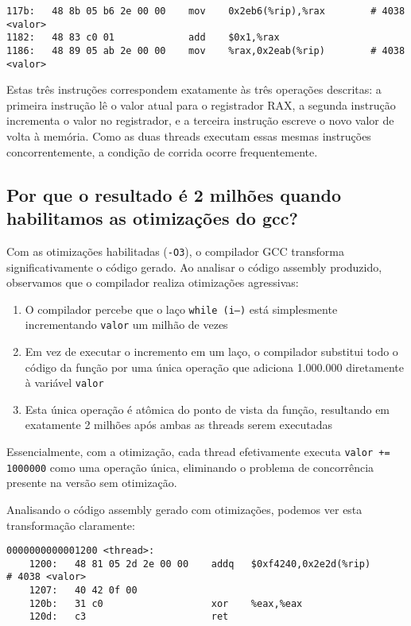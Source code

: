 \documentclass[12pt]{article}
\begin{document}
\begin{lstlisting}[language={[x86masm]Assembler}]
117b:	48 8b 05 b6 2e 00 00 	mov    0x2eb6(%rip),%rax        # 4038 <valor>
1182:	48 83 c0 01          	add    $0x1,%rax
1186:	48 89 05 ab 2e 00 00 	mov    %rax,0x2eab(%rip)        # 4038 <valor>
\end{lstlisting}

Estas três instruções correspondem exatamente às três operações descritas: a primeira instrução lê o valor atual para o registrador RAX, a segunda instrução incrementa o valor no registrador, e a terceira instrução escreve o novo valor de volta à memória. Como as duas threads executam essas mesmas instruções concorrentemente, a condição de corrida ocorre frequentemente.

\subsection{Por que o resultado é 2 milhões quando habilitamos as otimizações do gcc?}

Com as otimizações habilitadas (\texttt{-O3}), o compilador GCC transforma significativamente o código gerado. Ao analisar o código assembly produzido, observamos que o compilador realiza otimizações agressivas:

\begin{enumerate}
    \item O compilador percebe que o laço \texttt{while (i--)} está simplesmente incrementando \texttt{valor} um milhão de vezes
    \item Em vez de executar o incremento em um laço, o compilador substitui todo o código da função por uma única operação que adiciona 1.000.000 diretamente à variável \texttt{valor}
    \item Esta única operação é atômica do ponto de vista da função, resultando em exatamente 2 milhões após ambas as threads serem executadas
\end{enumerate}

Essencialmente, com a otimização, cada thread efetivamente executa \texttt{valor += 1000000} como uma operação única, eliminando o problema de concorrência presente na versão sem otimização.

Analisando o código assembly gerado com otimizações, podemos ver esta transformação claramente:

\begin{lstlisting}[language={[x86masm]Assembler}]
0000000000001200 <thread>:
    1200:	48 81 05 2d 2e 00 00 	addq   $0xf4240,0x2e2d(%rip)        # 4038 <valor>
    1207:	40 42 0f 00
    120b:	31 c0                	xor    %eax,%eax
    120d:	c3                   	ret
\end{lstlisting}
\end{document}
